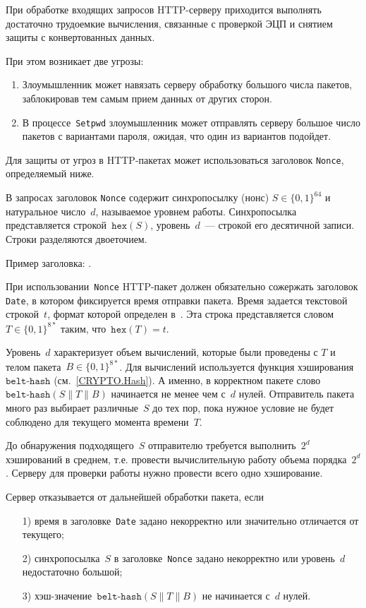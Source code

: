 При обработке входящих запросов HTTP-серверу приходится выполнять 
достаточно трудоемкие вычисления, связанные с проверкой ЭЦП и снятием 
защиты с конвертованных данных.

При этом возникает две угрозы:
\begin{enumerate}
\item
Злоумышленник может навязать серверу обработку большого числа пакетов, 
заблокировав тем самым прием данных от других сторон. 
\item
В процессе~\texttt{Setpwd} злоумышленник может отправлять серверу большое 
число пакетов с вариантами пароля, ожидая, что один из вариантов подойдет. 
\end{enumerate}

Для защиты от угроз в HTTP-пакетах может использоваться заголовок 
\texttt{Nonce}, определяемый ниже. 

В запросах заголовок \texttt{Nonce} содержит синхропосылку (нонс) 
$S\in\{0,1\}^{64}$ и натуральное число~$d$, называемое уровнем работы. 
Синхропосылка представляется строкой~$\texttt{hex}(S)$, уровень~$d$~--- 
строкой его десятичной записи. Строки разделяются двоеточием.

Пример заголовка: .

При использовании~\texttt{Nonce} HTTP-пакет должен обязательно 
сожержать заголовок \texttt{Date}, в котором фиксируется 
время отправки пакета. Время задается текстовой строкой~$t$, 
формат которой определен в~\cite{HTTP}. Эта строка представляется 
словом~$T\in\{0,1\}^{8*}$ таким, что~$\texttt{hex}(T)=t$.

Уровень~$d$ характеризует объем вычислений, которые были проведены
с $T$ и телом пакета~$B\in\{0,1\}^{8*}$.
Для вычислений используется функция хэширования~$\texttt{belt-hash}$
(см.~\ref{CRYPTO.Hash}). А именно, в корректном пакете 
слово~$\texttt{belt-hash}(S\parallel T\parallel B)$ начинается не менее 
чем с~$d$ нулей.
%
Отправитель пакета много раз выбирает различные~$S$ до тех пор, 
пока нужное условие не будет соблюдено для текущего момента времени~$T$.

До обнаружения подходящего~$S$ отправителю требуется выполнить~$2^d$ 
хэширований в среднем, т.е. провести вычислительную работу объема 
порядка~$2^d$. Серверу для проверки работы нужно провести всего одно 
хэширование. 

Сервер отказывается от дальнейшей обработки пакета, если
\begin{enumerate}
\item[1)] 
время в заголовке~\texttt{Date} задано некорректно или значительно 
отличается от текущего;
\item[2)] 
синхропосылка~$S$ в заголовке~\texttt{Nonce} задано некорректно или 
уровень~$d$ недостаточно большой;
\item[3)] 
хэш-значение~$\texttt{belt-hash}(S\parallel T\parallel B)$ не начинается 
с~$d$ нулей.
\end{enumerate}

